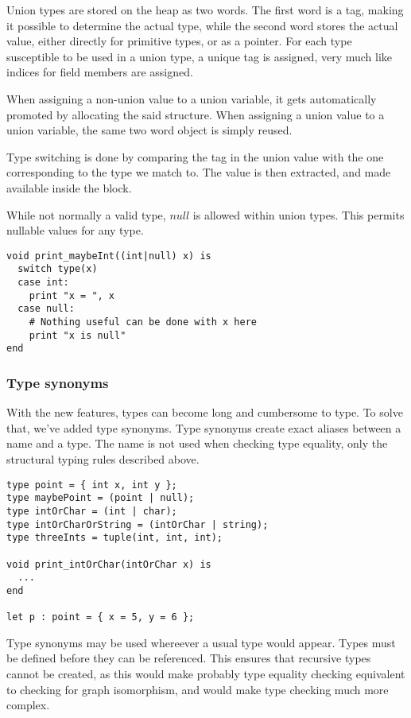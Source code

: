 \documentclass{article}
\begin{document}
Union types are stored on the heap as two words. The first word is a tag, making it possible to determine the actual
type, while the second word stores the actual value, either directly for primitive types, or as a pointer.
For each type susceptible to be used in a union type, a unique tag is assigned, very much like indices for field members
are assigned.

When assigning a non-union value to a union variable, it gets automatically promoted by allocating the said structure.
When assigning a union value to a union variable, the same two word object is simply reused.

Type switching is done by comparing the tag in the union value with the one corresponding to the type we match to.
The value is then extracted, and made available inside the block.

While not normally a valid type, $null$ is allowed within union types. This permits nullable values for any type.
\begin{lstlisting}
void print_maybeInt((int|null) x) is
  switch type(x)
  case int:
    print "x = ", x
  case null:
    # Nothing useful can be done with x here
    print "x is null"
end
\end{lstlisting}

\subsubsection{Type synonyms}
With the new features, types can become long and cumbersome to type. To solve that, we've added type synonyms. Type synonyms
create exact aliases between a name and a type. The name is not used when checking type equality, only the structural typing
rules described above.

\begin{lstlisting}
type point = { int x, int y };
type maybePoint = (point | null);
type intOrChar = (int | char);
type intOrCharOrString = (intOrChar | string);
type threeInts = tuple(int, int, int);

void print_intOrChar(intOrChar x) is
  ...
end

let p : point = { x = 5, y = 6 };
\end{lstlisting}

Type synonyms may be used whereever a usual type would appear.
Types must be defined before they can be referenced. This ensures that recursive types cannot be created, as this would make
probably type equality checking equivalent to checking for graph isomorphism, and would make type checking much more complex.
\end{document}

